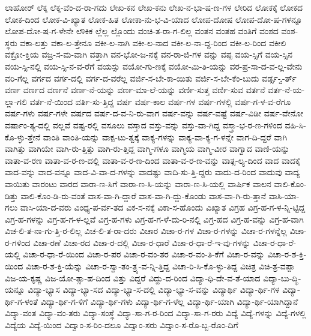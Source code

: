 {ಲಾಹೋರ್
ಲೆಕ್ಕ
ಲೆಕ್ಕ-ವೆಂ-ದ-ರಾ-ಗದು
ಲೇಖ-ಕನ
ಲೇಖ-ಕನು
ಲೇಖ-ನ-ಭಾ-ಷ-ಣ-ಗಳ
ಲೇರಿದ
ಲೋಕಕ್ಕೆ
ಲೋಕದ
ಲೋಕ-ದಿಂದ
ಲೋಕ-ವಿ-ಖ್ಯಾತ
ಲೋಕ-ಹಿತ
ಲೋಕಾ-ನು-ಭ-ವಿ-ಯಾದ
ಲೋಪ-ದೋಷ
ಲೋಪ-ದೋ-ಷ-ಗಳನ್ನೂ
ಲೋಪ-ದೋ-ಷ-ಗ-ಳೇನೇ
ಲೌಕಿಕ
ಲ್ಲೆಲ್ಲ
ಲ್ಲೊಂದು
ವಂಚಿ-ತ-ರಾ-ಗ-ಲಿಲ್ಲ
ವಂತನ
ವಂತಹ
ವಂತಿಗೆ
ವಂಶದ
ವಂಶ-ಸ್ಥರು
ವಕಾ-ಲತ್ತು
ವಕಾ-ಲ-ತ್ತೇನೂ
ವಕೀ-ಲ-ನಾಗಿ
ವಕೀ-ಲ-ನಾದ
ವಕೀ-ಲ-ನಾ-ದ್ದ-ರಿಂದ
ವಕೀ-ಲ-ರಿಂದ
ವಕೀಲಿ
ವಕ್ರೋ-ಕ್ತಿಯ
ವಜ್ರ-ಸ-ಮ-ವಾಗಿ
ವತ್ತಾಗಿ
ವನ-ಭೋ-ಜ-ನಕ್ಕೆ
ವನ-ರಾ-ಜಿ-ಗಳ
ವನ್ನು
ವಪ್ಪ
ವಯ-ಸ್ಸಿಗೆ
ವಯ-ಸ್ಸಿನ
ವಯ-ಸ್ಸಿ-ನಲ್ಲಿ
ವಯ-ಸ್ಸಿ-ನ-ವ-ರೆಗೆ
ವಯಸ್ಸು
ವಯೋ-ಗು-ಣಕ್ಕೆ
ವಯೋ-ಮಿ-ತಿ-ಯನ್ನು
ವರ-ಪ್ರ-ಸಾ-ದ-ವ-ಲ್ಲ-ವೇನು
ವರಿ-ಗೆಲ್ಲ
ವರ್ಗದ
ವರ್ಗ-ದಲ್ಲಿ
ವರ್ಗ-ದ-ವರೆಲ್ಲ
ವರ್ಜಿ-ಸ-ಬೇ-ಕಾ-ಯಿತು
ವರ್ಜಿ-ಸ-ಬೇ-ಕೆಂ-ಬುದು
ವರ್ಡ್ಸ-್ವ-ರ್ತ್
ವರ್ಣ
ವರ್ಣದ
ವರ್ಣನೆ
ವರ್ಣ-ನೆ-ಯನ್ನು
ವರ್ಣ-ಮಾ-ಲೆ-ಯನ್ನು
ವರ್ಣಿ-ಸುತ್ತ
ವರ್ಣಿ-ಸುವ
ವರ್ತನೆ
ವರ್ತ-ನೆ-ಯ-ಲ್ಲಾ-ಗಲಿ
ವರ್ತ-ನೆ-ಯಿಂದ
ವರ್ತಿ-ಸು-ತ್ತಿದ್ದ
ವರ್ಷ
ವರ್ಷ-ಕಾಲ
ವರ್ಷ-ಗಳ
ವರ್ಷ-ಗಳಲ್ಲಿ
ವರ್ಷ-ಗ-ಳ-ವ-ರೆಗೂ
ವರ್ಷ-ಗಳು
ವರ್ಷ-ಗಳೇ
ವರ್ಷದ
ವರ್ಷ-ದ-ವ-ನಿ-ರು-ವಾಗ
ವರ್ಷ-ವನ್ನು
ವರ್ಷ-ವಷ್ಟೆ
ವರ್ಷ-ವಿಡೀ
ವರ್ಷ-ವೇನೋ
ವರ್ಷಾಂ-ತ್ಯ-ದಲ್ಲಿ
ವಲ್ಲವೆ
ವಷ್ಟ-ರಲ್ಲಿ
ವಸೂಲು
ವಸ್ತಾದ
ವಸ್ತು-ವನ್ನು
ವಸ್ತು-ವಾ-ಗಿದ್ದ
ವಸ್ತ್ರಾ-ಭ-ರ-ಣ-ಗಳಿಂದ
ವಹಿ-ಸಿ-ಕೊ-ಳ್ಳು-ತ್ತೇನೆ
ವಾಂತಿ
ವಾಂತಿ-ಯನ್ನು
ವಾಕ್ಪ-ಟು-ತ್ವಕ್ಕೆ
ವಾಕ್ಯ-ಗಳನ್ನು
ವಾಕ್ಯ-ವಾ-ಕ್ಯ-ಗ-ಳನ್ನೇ
ವಾಗ-ದಿ-ದ್ದರೆ
ವಾಗಿ
ವಾಗಿತ್ತು
ವಾಗಿಯೇ
ವಾಗಿ-ರು-ತ್ತಿತ್ತು
ವಾಗಿ-ರು-ತ್ತಿದ್ದ
ವಾಗ್ಮಿ-ಗಳೂ
ವಾಗ್ಮಿಯ
ವಾಗ್ಮಿ-ವೀರ
ವಾಗ್ವಾದ
ವಾಣಿ-ಯನ್ನು
ವಾತಾ-ವ-ರಣ
ವಾತಾ-ವ-ರ-ಣ-ದಲ್ಲಿ
ವಾತಾ-ವ-ರ-ಣ-ದಿಂದ
ವಾತಾ-ವ-ರ-ಣ-ವನ್ನು
ವಾತ್ಸ-ಲ್ಯ-ದಿಂದ
ವಾದ
ವಾದಕ್ಕೆ
ವಾದ-ವನ್ನು
ವಾದ-ವನ್ನೂ
ವಾದ-ವಿ-ವಾ-ದ-ಗಳನ್ನು
ವಾದಷ್ಟು
ವಾದಿ-ಸು-ತ್ತಿ-ದ್ದರು
ವಾದು-ದ-ರಿಂದ
ವಾದುವು
ವಾದ್ಯ
ವಾಯಿತು
ವಾರಂಟು
ವಾರದ
ವಾರಾ-ಣ-ಸಿಗೆ
ವಾರಾ-ಣ-ಸಿ-ಯನ್ನು
ವಾರಾ-ಣ-ಸಿ-ಯಲ್ಲಿ
ವಾರ್ಷಿಕ
ವಾಲನ
ವಾಲಿ-ಕೊಂ-ಡಿತ್ತು
ವಾಲಿ-ಕೊಂ-ಡಿ-ರು-ವಂತೆ
ವಾಸ-ವಾ-ಗಿ-ದ್ದಾರೆ
ವಾಸ-ವಾ-ಗಿ-ದ್ದು-ಕೊಂಡು
ವಾಸ-ವಾ-ಗಿ-ರು-ತ್ತಾನೆ
ವಾಸಿ-ಯಾ-ಗಲು
ವಾಸಿ-ಯಾ-ದ-ವರು
ವಿಂಧ್ಯ-ಪ-ರ್ವ-ತದ
ವಿಕ-ಸ-ನಕ್ಕೆ
ವಿಕಾ-ಸ-ಹೊಂದು
ವಿಖ್ಯಾತ
ವಿಗ್ರಹ
ವಿಗ್ರ-ಹ-ಗ-ಳ-ನ್ನಿ-ಟ್ಟಿದ್ದ
ವಿಗ್ರ-ಹ-ಗಳನ್ನು
ವಿಗ್ರ-ಹ-ಗ-ಳ-ಲ್ಲವೆ
ವಿಗ್ರ-ಹ-ಗಳು
ವಿಗ್ರ-ಹ-ಗ-ಳೆ-ದು-ರಿ-ನಲ್ಲಿ
ವಿಗ್ರ-ಹದ
ವಿಗ್ರ-ಹ-ವನ್ನು
ವಿಗ್ರ-ಹ-ವಾಗಿ
ವಿಚ-ಲಿ-ತ-ನಾ-ಗು-ತ್ತಿ-ರ-ಲಿಲ್ಲ
ವಿಚ-ಲಿ-ತ-ರಾ-ದರು
ವಿಚಾರ
ವಿಚಾ-ರ-ಗಳ
ವಿಚಾ-ರ-ಗಳನ್ನು
ವಿಚಾ-ರ-ಗಳನ್ನೆಲ್ಲ
ವಿಚಾ-ರ-ಗಳಿಂದ
ವಿಚಾ-ರಣೆ
ವಿಚಾ-ರದ
ವಿಚಾ-ರ-ದಲ್ಲಿ
ವಿಚಾ-ರ-ಧಾರೆ
ವಿಚಾ-ರ-ಧಾ-ರೆ-ಇ-ವು-ಗಳನ್ನು
ವಿಚಾ-ರ-ಧಾ-ರೆ-ಯಲ್ಲಿ
ವಿಚಾ-ರ-ಧಾ-ರೆ-ಯಿಂದ
ವಿಚಾ-ರ-ಪರ
ವಿಚಾ-ರ-ವಂ-ತರ
ವಿಚಾ-ರ-ವಂ-ತಿ-ಕೆಗೆ
ವಿಚಾ-ರ-ವನ್ನು
ವಿಚಾ-ರ-ಶ-ಕ್ತಿ-ಯಿಂದ
ವಿಚಾ-ರ-ಶ-ಕ್ತಿ-ಯೆನ್ನು
ವಿಚಾ-ರ-ಸ್ವಾ-ತಂ-ತ್ರ್ಯ-ವ-ನ್ನಿ-ತ್ತಿದ್ದ
ವಿಚಾ-ರಿ-ಸಿ-ಕೊ-ಳ್ಳು-ತಿದ್ದ
ವಿಚಿತ್ರ
ವಿಚಿ-ತ್ರ-ವಪ್ಪಾ
ವಿಜ-ಯ-ಕೃಷ್ಣ
ವಿಜ-ಯೋ-ತ್ಸಾ-ಹ-ದಿಂದ
ವಿತ್ತು
ವಿದ್ದರೆ
ವಿದ್ದು-ದ-ರಿಂದ
ವಿದ್ಯಾ-ಧಿ-ದೇ-ವ-ತೆ-ಯಾದ
ವಿದ್ಯಾ-ಬು-ದ್ಧಿ-ಯನ್ನೂ
ವಿದ್ಯಾ-ಭ್ಯಾಸ
ವಿದ್ಯಾ-ಭ್ಯಾ-ಸದ
ವಿದ್ಯಾ-ಭ್ಯಾ-ಸ-ದಲ್ಲಿ
ವಿದ್ಯಾ-ಭ್ಯಾ-ಸ-ವನ್ನು
ವಿದ್ಯಾರ್ಥಿ
ವಿದ್ಯಾ-ರ್ಥಿ-ಗಳ
ವಿದ್ಯಾ-ರ್ಥಿ-ಗ-ಳಂತೆ
ವಿದ್ಯಾ-ರ್ಥಿ-ಗ-ಳಿಗೆ
ವಿದ್ಯಾ-ರ್ಥಿ-ಗಳು
ವಿದ್ಯಾ-ರ್ಥಿ-ಗ-ಳೆಲ್ಲ
ವಿದ್ಯಾ-ರ್ಥಿ-ಯಾಗಿ
ವಿದ್ಯಾ-ರ್ಥಿ-ಯಾಗಿದ್ದಾನೆ
ವಿದ್ಯಾ-ವಂತ
ವಿದ್ಯಾ-ವಂ-ತರು
ವಿದ್ಯಾ-ಸಂಸ್ಥೆ
ವಿದ್ಯಾ-ಸಾ-ಗ-ರ-ರಿಂದ
ವಿದ್ಯಾ-ಸಾ-ಗ-ರರು
ವಿದ್ಯೆ
ವಿದ್ಯೆ-ಗಳನ್ನು
ವಿದ್ಯೆ-ಗಳಲ್ಲಿ
ವಿದ್ಯೆಯ
ವಿದ್ಯೆ-ಯಿಂದ
ವಿದ್ವಾಂ-ಸ-ರಿಂ-ದಲೂ
ವಿದ್ವಾಂ-ಸರು
ವಿದ್ವಾಂ-ಸ-ರೊ-ಬ್ಬ-ರೊಂ-ದಿಗೆ
}
